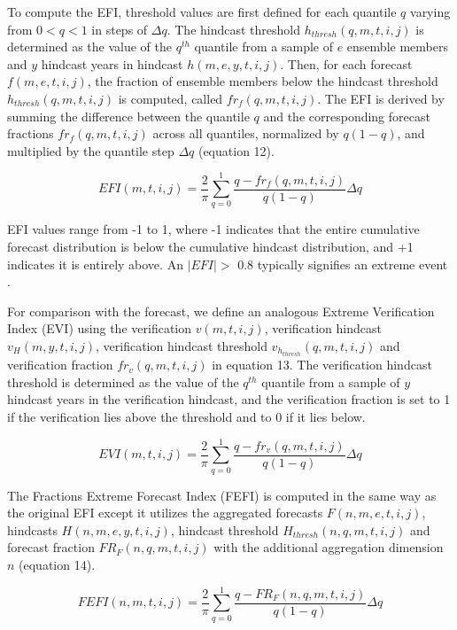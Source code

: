 \documentclass[preprint,12pt,authoryear]{elsarticle}
\begin{document}
To compute the EFI, threshold values are first defined for each quantile $q$ varying from $0 < q < 1$ in steps of $\Delta q$. The hindcast threshold $h_{thresh}(q,m,t,i,j)$ is determined as the value of the $q^{th}$ quantile from a sample of $e$ ensemble members and $y$ hindcast years in hindcast $h(m,e,y,t,i,j)$. Then, for each forecast $f(m,e,t,i,j)$, the fraction of ensemble members below the hindcast threshold $h_{thresh}(q,m,t,i,j)$ is computed, called $fr_{f}(q,m,t,i,j)$. The EFI is derived by summing the difference between the quantile $q$ and the corresponding forecast fractions $fr_{f}(q,m,t,i,j)$ across all quantiles, normalized by $q(1-q)$, and multiplied by the quantile step $\Delta q$ (equation 12).

\begin{equation}
    EFI(m,t,i,j) = \frac{2}{\pi}\sum_{q=0}^{1} \frac{q - fr_{f}(q,m,t,i,j)}{q(1-q)}\Delta q
\end{equation}

EFI values range from -1 to 1, where -1 indicates that the entire cumulative forecast distribution is below the cumulative hindcast distribution, and +1 indicates it is entirely above. An $|EFI| > $ 0.8 typically signifies an extreme event \citep{ECMWFc}.


For comparison with the forecast, we define an analogous Extreme Verification Index (EVI) using the verification $v(m,t,i,j)$, verification hindcast $v_{H}(m,y,t,i,j)$, verification hindcast threshold $v_{{h}_{thresh}}(q,m,t,i,j)$ and verification fraction $fr_{v}(q,m,t,i,j)$ in equation 13. The verification hindcast threshold is determined as the value of the $q^{th}$ quantile from a sample of $y$ hindcast years in the verification hindcast, and the verification fraction is set to 1 if the verification lies above the threshold and to 0 if it lies below.

\begin{equation}
    EVI(m,t,i,j) = \frac{2}{\pi}\sum_{q=0}^{1} \frac{q - fr_{v}(q,m,t,i,j)}{q(1-q)}\Delta q
\end{equation}


The Fractions Extreme Forecast Index (FEFI) is computed in the same way as the original EFI except it utilizes the aggregated forecasts $F(n,m,e,t,i,j)$, hindcasts $H(n,m,e,y,t,i,j)$, hindcast threshold $H_{thresh}(n,q,m,t,i,j)$ and forecast fraction $FR_{F}(n,q,m,t,i,j)$ with the additional aggregation dimension $n$ (equation 14).

\begin{equation}
    FEFI(n,m,t,i,j) = \frac{2}{\pi}\sum_{q=0}^{1} \frac{q - FR_{F}(n,q,m,t,i,j)}{q(1-q)}\Delta q
\end{equation}
\end{document}
